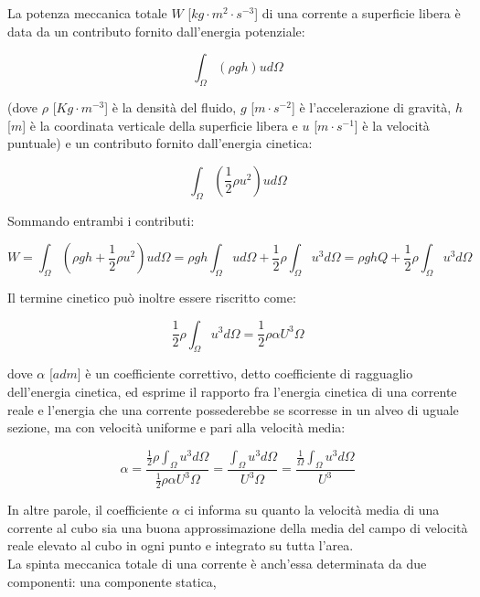\documentclass[12pt]{article} %
\begin{document}
\noindent La potenza meccanica totale $W$ [$kg\cdot m^2\cdot s^{-3}$] di una corrente a superficie libera è data da un contributo fornito dall’energia potenziale:

\begin{equation}
   \int_{\Omega}^{}(\rho gh)ud\Omega
   \label{eqn:W_energia_potenziale}
\end{equation}

\noindent (dove $\rho$ [$Kg \cdot m^{-3}$] è la densità del fluido, $g$ [$m\cdot s^{-2}$] è l'accelerazione di gravità, $h$ [$m$] è la coordinata verticale della superficie libera e $u$ [$m\cdot s^{-1}$] è la velocità puntuale) e un contributo fornito dall’energia cinetica:

\begin{equation}
   \int_{\Omega}^{}\left(\frac{1}{2}\rho u^{2}\right)ud\Omega
   \label{eqn:W_energia_cinetica}
\end{equation}

\noindent Sommando entrambi i contributi:  

\begin{equation}
   W=\int_{\Omega}^{}(\rho gh+\frac{1}{2}\rho u^{2})ud\Omega=\rho gh\int_{\Omega}^{} ud\Omega + \frac{1}{2}\rho \int_{\Omega}^{} u^{3}d\Omega=\rho ghQ + \frac{1}{2}\rho \int_{\Omega}^{} u^{3}d\Omega
   \label{eqn:W}
\end{equation}

\noindent Il termine cinetico può inoltre essere riscritto come:

\begin{equation}
   \frac{1}{2}\rho \int_{\Omega}^{} u^{3}d\Omega=\frac{1}{2}\rho \alpha U^{3}\Omega
   \label{eqn:energia_cinetica_alfa}
\end{equation}

\noindent dove $\alpha$ [$adm$] è un coefficiente correttivo, detto coefficiente di ragguaglio dell’energia cinetica, ed esprime il rapporto fra l’energia cinetica di una corrente reale e l’energia che una corrente possederebbe se scorresse in un alveo di uguale sezione, ma con velocità uniforme e pari alla velocità media:

\begin{equation}
   \alpha=\frac{\frac{1}{2}\rho \int_{\Omega}^{} u^{3}d\Omega}{\frac{1}{2}\rho \alpha U^{3}\Omega}=\frac{\int_{\Omega}^{} u^{3}d\Omega}{U^{3}\Omega}=\frac{\frac{1}{\Omega}\int_{\Omega}^{} u^{3}d\Omega}{U^{3}}
   \label{eqn:alfa}
\end{equation}

\noindent In altre parole, il coefficiente $\alpha$ ci informa su quanto la velocità media di una corrente al cubo sia una buona approssimazione della media del campo di velocità reale elevato al cubo in ogni punto e integrato su tutta l’area.\\
La spinta meccanica totale di una corrente è anch’essa determinata da due componenti: una componente statica,
\end{document}
